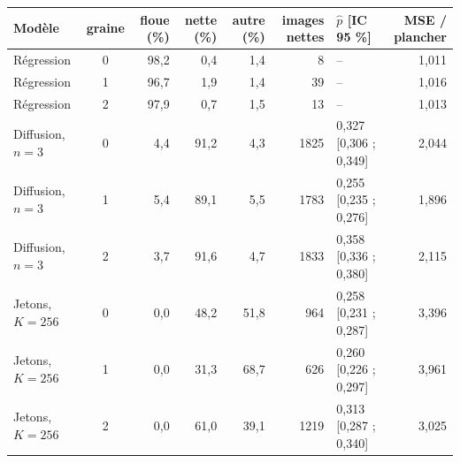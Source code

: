 \begin{tabular}{@{}lcrrrrlr@{}}
\toprule
Modèle & graine & floue (\%) & nette (\%) & autre (\%) & images nettes & $\hat p$ [IC 95 \%] & MSE / plancher \\
\midrule
Régression & 0 & 98,2 & 0,4 & 1,4 & 8 & -- & 1,011 \\
Régression & 1 & 96,7 & 1,9 & 1,4 & 39 & -- & 1,016 \\
Régression & 2 & 97,9 & 0,7 & 1,5 & 13 & -- & 1,013 \\
\addlinespace
Diffusion, $n=3$ & 0 & 4,4 & 91,2 & 4,3 & 1825 & 0,327 [0,306 ; 0,349] & 2,044 \\
Diffusion, $n=3$ & 1 & 5,4 & 89,1 & 5,5 & 1783 & 0,255 [0,235 ; 0,276] & 1,896 \\
Diffusion, $n=3$ & 2 & 3,7 & 91,6 & 4,7 & 1833 & 0,358 [0,336 ; 0,380] & 2,115 \\
\addlinespace
Jetons, $K=256$ & 0 & 0,0 & 48,2 & 51,8 & 964 & 0,258 [0,231 ; 0,287] & 3,396 \\
Jetons, $K=256$ & 1 & 0,0 & 31,3 & 68,7 & 626 & 0,260 [0,226 ; 0,297] & 3,961 \\
Jetons, $K=256$ & 2 & 0,0 & 61,0 & 39,1 & 1219 & 0,313 [0,287 ; 0,340] & 3,025 \\
\bottomrule
\end{tabular}
